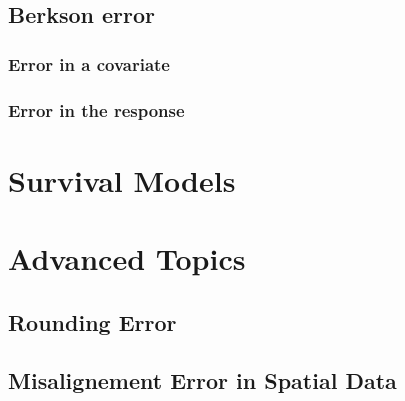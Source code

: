 \documentclass[]{book}
\theoremstyle{definition}
\theoremstyle{definition}
\theoremstyle{definition}
\theoremstyle{remark}
\begin{document}
\section{Berkson error}\label{berkson-error}

\subsection{Error in a covariate}\label{error-in-a-covariate-1}

\subsection{Error in the response}\label{error-in-the-response-2}

\chapter{Survival Models}\label{Survival}

\chapter{Advanced Topics}\label{advancedTopics}

\section{Rounding Error}\label{rounding-error}

\section{Misalignement Error in Spatial
Data}\label{misalignement-error-in-spatial-data}


\end{document}
